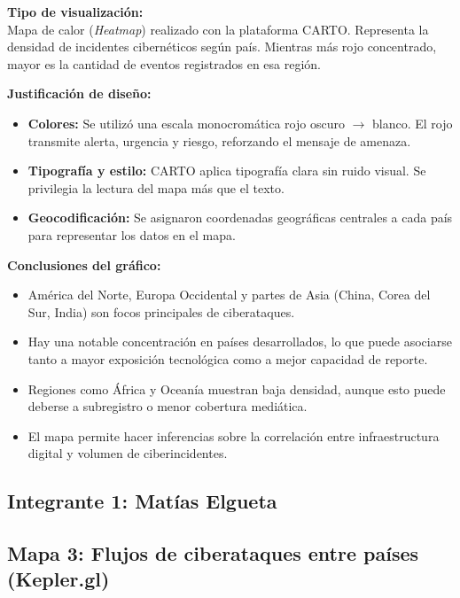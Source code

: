 \documentclass[12pt, a4paper]{article}
\begin{document}
\vspace{0.5em}
\textbf{Tipo de visualización:} \\
Mapa de calor (\textit{Heatmap}) realizado con la plataforma CARTO. Representa la densidad de incidentes cibernéticos según país. Mientras más rojo concentrado, mayor es la cantidad de eventos registrados en esa región.

\vspace{0.5em}
\textbf{Justificación de diseño:} \\
\begin{itemize}
    \item \textbf{Colores:} Se utilizó una escala monocromática rojo oscuro $\rightarrow$ blanco. El rojo transmite alerta, urgencia y riesgo, reforzando el mensaje de amenaza.
    \item \textbf{Tipografía y estilo:} CARTO aplica tipografía clara sin ruido visual. Se privilegia la lectura del mapa más que el texto.
    \item \textbf{Geocodificación:} Se asignaron coordenadas geográficas centrales a cada país para representar los datos en el mapa.
\end{itemize}

\vspace{0.5em}
\textbf{Conclusiones del gráfico:} \\
\begin{itemize}
    \item América del Norte, Europa Occidental y partes de Asia (China, Corea del Sur, India) son focos principales de ciberataques.
    \item Hay una notable concentración en países desarrollados, lo que puede asociarse tanto a mayor exposición tecnológica como a mejor capacidad de reporte.
    \item Regiones como África y Oceanía muestran baja densidad, aunque esto puede deberse a subregistro o menor cobertura mediática.
    \item El mapa permite hacer inferencias sobre la correlación entre infraestructura digital y volumen de ciberincidentes.
\end{itemize}

\newpage
\subsection*{Integrante 1: Matías Elgueta}

\subsection*{Mapa 3: Flujos de ciberataques entre países (Kepler.gl)}
\end{document}
